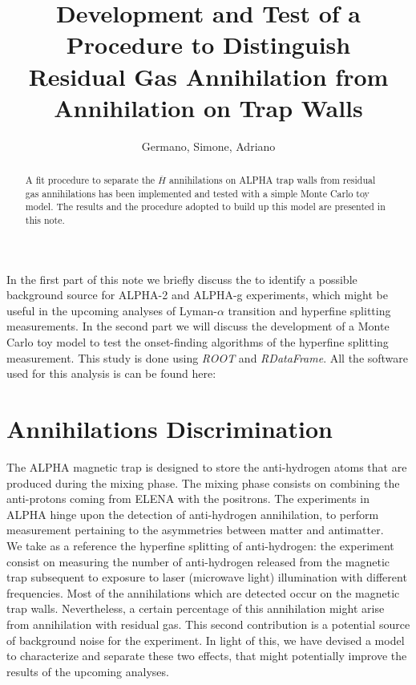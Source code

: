 \documentclass[11pt,a4paper,oneside]{article}
\title{%
 \vspace{-2.0cm}
 Development and Test of a Procedure to Distinguish \\ Residual Gas Annihilation from Annihilation on Trap Walls
}
\date{\vspace{-5ex}}
\author{Germano, Simone, Adriano}
\begin{document}

\maketitle
\begin{abstract}
\centering
A fit procedure to separate the $\overline{H}$ annihilations on ALPHA trap walls from residual gas annihilations has been implemented and tested with a simple Monte Carlo toy model. The results and the procedure adopted to build up this model are presented in this note.
\end{abstract}


In the first part of this note we briefly discuss  the to identify a possible background source for ALPHA-2 and ALPHA-g experiments, which might be useful in the upcoming analyses of Lyman-$\alpha$ transition  and hyperfine splitting measurements. In the second part we will discuss the development of a Monte Carlo toy model to test the onset-finding algorithms of the hyperfine splitting measurement.
This study is done using \textit{ROOT} and \textit{RDataFrame}. All the software used for this analysis is can be found here: {}

\section*{Annihilations Discrimination}

The ALPHA magnetic trap is designed to store the anti-hydrogen atoms that are produced during the mixing phase. The mixing phase consists on combining the anti-protons coming from ELENA with the positrons. 
The experiments in ALPHA hinge upon the detection of anti-hydrogen annihilation, to perform measurement pertaining to the asymmetries between matter and antimatter.\\
We take as a reference the hyperfine splitting of anti-hydrogen: the experiment consist on measuring the number of anti-hydrogen released from the magnetic trap subsequent to exposure to laser (microwave light) illumination with different frequencies. Most of the annihilations which are detected occur on the magnetic trap walls. Nevertheless, a certain percentage of this annihilation might arise from annihilation with residual gas. This second contribution is a potential source of background noise for the experiment. In light of this, we have devised a model to characterize and separate these two effects, that might potentially improve the results of the upcoming analyses.
\end{document}
